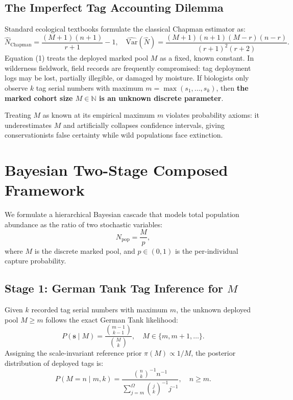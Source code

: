 \documentclass[11pt,a4paper]{article}
\begin{document}
\subsection{The Imperfect Tag Accounting Dilemma}
Standard ecological textbooks formulate the classical Chapman estimator as:
\begin{equation}
\hat{N}_{\text{Chapman}} = \frac{(M + 1)(n + 1)}{r + 1} - 1, \quad \widehat{\text{Var}}(\hat{N}) = \frac{(M+1)(n+1)(M-r)(n-r)}{(r+1)^2(r+2)}.
\end{equation}
Equation (1) treats the deployed marked pool $M$ as a fixed, known constant. In wilderness fieldwork, field records are frequently compromised: tag deployment logs may be lost, partially illegible, or damaged by moisture. If biologists only observe $k$ tag serial numbers with maximum $m = \max(s_1, \dots, s_k)$, then \textbf{the marked cohort size $M \in \mathbb{N}$ is an unknown discrete parameter}.

Treating $M$ as known at its empirical maximum $m$ violates probability axioms: it underestimates $M$ and artificially collapses confidence intervals, giving conservationists false certainty while wild populations face extinction.

\section{Bayesian Two-Stage Composed Framework}

We formulate a hierarchical Bayesian cascade that models total population abundance as the ratio of two stochastic variables:
\begin{equation}
N_{\text{pop}} = \frac{M}{p},
\end{equation}
where $M$ is the discrete marked pool, and $p \in (0, 1)$ is the per-individual capture probability.

\subsection{Stage 1: German Tank Tag Inference for \texorpdfstring{$M$}{M}}
Given $k$ recorded tag serial numbers with maximum $m$, the unknown deployed pool $M \ge m$ follows the exact German Tank likelihood:
\begin{equation}
P(\mathbf{s} \mid M) = \frac{\binom{m-1}{k-1}}{\binom{M}{k}}, \quad M \in \{m, m+1, \dots\}.
\end{equation}
Assigning the scale-invariant reference prior $\pi(M) \propto 1/M$, the posterior distribution of deployed tags is:
\begin{equation}
P(M = n \mid m, k) = \frac{\binom{n}{k}^{-1} n^{-1}}{\sum_{j=m}^\Omega \binom{j}{k}^{-1} j^{-1}}, \quad n \ge m.
\end{equation}
\end{document}
